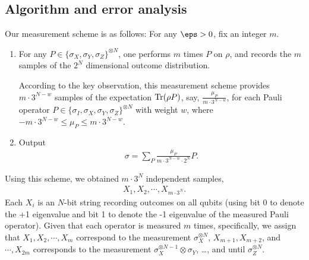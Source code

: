 \subsection{Algorithm and error analysis} 
Our measurement scheme is as follows: For any $\eps>0$, fix an integer $m$.
\begin{enumerate}
    \item  For any $P\in\{\sigma_X,\sigma_Y,\sigma_Z\}^{\otimes N}$, one performs $m$ times $P$ on $\rho$, and records the $m$ samples of the $2^N$ dimensional outcome distribution.


According to the key observation, this measurement scheme provides $m\cdot 3^{N-w}$ samples of the expectation $\operatorname{Tr}(\rho P)$, say, $\frac{\mu_P}{m\cdot 3^{N-w}}$, for each Pauli operator $P\in \{\sigma_I,\sigma_X,\sigma_Y,\sigma_Z\}^{\otimes N}$ with weight $w$, where $-m\cdot 3^{N-w}\leq\mu_P\leq m\cdot 3^{N-w}$.

\item Output 
\begin{align*}
\sigma=\sum_P \frac{\mu_P}{m\cdot 3^{N-w}\cdot 2^N} P.
\end{align*}
\end{enumerate}


Using this scheme, we obtained $m\cdot 3^N$ independent samples,
\begin{align*}
X_1,X_2,\cdots, X_{m\cdot 3^N}.
\end{align*}
Each  $X_i$ is an $N$-bit string recording outcomes on all qubits (using bit 0 to denote the +1 eigenvalue and bit 1 to denote the -1 eigenvalue of the measured Pauli operator).   
Given that each operator is measured $m$ times, specifically, we assign that $X_1,X_2,\cdots,X_{m}$ correspond to the measurement $\sigma_X^{\otimes N}$, $X_{m+1},X_{m+2}$, and $\cdots,X_{2m}$ corresponds to the measurement $\sigma_X^{\otimes N-1}\otimes \sigma_Y$, \dots, and until $\sigma_Z^{\otimes N}$.

